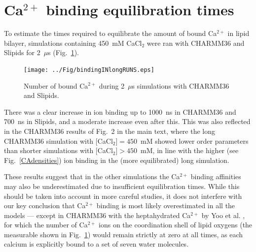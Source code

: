 \documentclass[twoside,twocolumn,9pt]{article}
\begin{document}





\section{Ca$^{2+}$ binding equilibration times}
To estimate the times required to equilibrate the amount of bound Ca$^{2+}$ in lipid bilayer,
simulations containing 450~mM CaCl$_2$ were ran with CHARMM36 and Slipids  for 2~$\mu$s (Fig.~\ref{longruns}).
\begin{figure}[h]
  \centering
  \texttt{[image: ../Fig/bindingINlongRUNS.eps]} 
  \caption{\label{longruns}
    Number of bound Ca$^{2+}$ during 2~$\mu$s simulations with CHARMM36 and Slipids.
}
\end{figure}
There was a clear increase in ion binding up to 1000~ns in CHARMM36 and 700~ns in Slipids,
and a moderate increase even after this. This was also reflected in the CHARMM36 results of Fig.~2 in the main text, where
the long CHARMM36 simulation with $[$CaCl$_2]=450$~mM showed lower order parameters than shorter simulations
with  $[$CaCl$_2]>450$~mM, in line
with the higher (see Fig.~\ref{CAdensities})  ion binding in the (more equilibrated) long simulation. 

These results suggest that in the other simulations the Ca$^{2+}$ binding affinities 
may also be underestimated due to insufficient equilibration times. While this should be taken into account in more careful studies,
it does not interfere with our key conclusion that Ca$^{2+}$ binding is most likely overestimated in all the
models --- except in CHARMM36 with the heptahydrated Ca$^{2+}$ by Yoo et al. \cite{yoo16},
for which the number of Ca$^{2+}$ ions on the coordination shell of lipid oxygens (the measurable shown in Fig.~\ref{longruns})
would remain strictly at zero at all times, as each calcium is explicitly bound to a set of seven water molecules.
\end{document}
